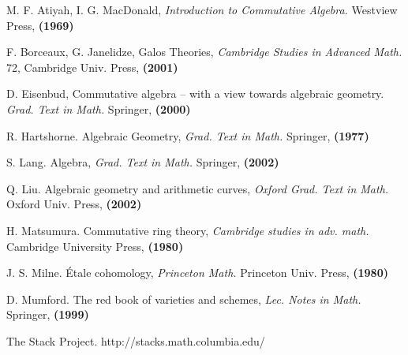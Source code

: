 \newpage

\begin{thebibliography}{10}

M. F. Atiyah, I. G. MacDonald, 
{\em Introduction to Commutative Algebra.}
Westview Press, \textbf{(1969)}

F. Borceaux, G. Janelidze,
Galos Theories,
{\em Cambridge Studies in Advanced Math.} 72,
Cambridge Univ. Press, \textbf{(2001)}

D. Eisenbud,
Commutative algebra -- with a view towards algebraic geometry.
{\em Grad. Text in Math.}
Springer, \textbf{(2000)}

R. Hartshorne.
Algebraic Geometry, {\em Grad. Text in Math.}
Springer, \textbf{(1977)}

S. Lang.
Algebra, {\em Grad. Text in Math.}
Springer, \textbf{(2002)}

Q. Liu.
Algebraic geometry and arithmetic curves, {\em Oxford Grad. Text in Math.}
Oxford Univ. Press, \textbf{(2002)}

H. Matsumura.
Commutative ring theory, {\em Cambridge studies in adv. math.}
Cambridge University Press, \textbf{(1980)}

J. S. Milne.
\'Etale cohomology, {\em Princeton Math.}
Princeton Univ. Press, \textbf{(1980)}

D. Mumford.
The red book of varieties and schemes, {\em Lec. Notes in Math.}
Springer, \textbf{(1999)}

The Stack Project.
http://stacks.math.columbia.edu/

\end{thebibliography}

